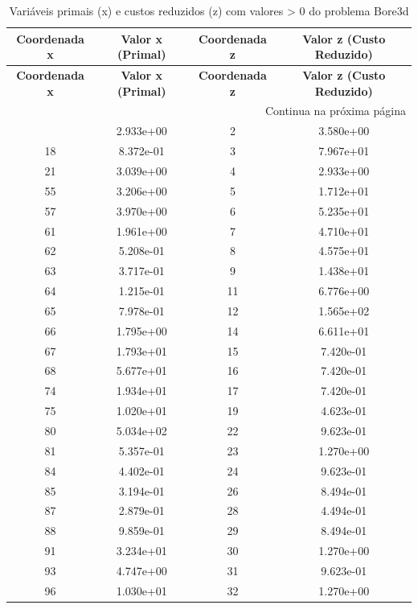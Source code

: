 \documentclass[12pt]{article}
\begin{document}
\begin{longtable}{@{}cccc@{}}
\caption{Variáveis primais (x) e custos reduzidos (z) com valores > 0 do problema Bore3d} \\
\toprule
\textbf{Coordenada x} & \textbf{Valor x (Primal)} & \textbf{Coordenada z} & \textbf{Valor z (Custo Reduzido)} \\
\midrule
\endfirsthead

\toprule
\textbf{Coordenada x} & \textbf{Valor x (Primal)} & \textbf{Coordenada z} & \textbf{Valor z (Custo Reduzido)} \\
\midrule
\endhead

\midrule \multicolumn{4}{r}{{Continua na próxima página}} \\ \midrule
\endfoot

\bottomrule
\endlastfoot
1 & 2.933e+00 & 2 & 3.580e+00 \\
18 & 8.372e-01 & 3 & 7.967e+01 \\
21 & 3.039e+00 & 4 & 2.933e+00 \\
55 & 3.206e+00 & 5 & 1.712e+01 \\
57 & 3.970e+00 & 6 & 5.235e+01 \\
61 & 1.961e+00 & 7 & 4.710e+01 \\
62 & 5.208e-01 & 8 & 4.575e+01 \\
63 & 3.717e-01 & 9 & 1.438e+01 \\
64 & 1.215e-01 & 11 & 6.776e+00 \\
65 & 7.978e-01 & 12 & 1.565e+02 \\
66 & 1.795e+00 & 14 & 6.611e+01 \\
67 & 1.793e+01 & 15 & 7.420e-01 \\
68 & 5.677e+01 & 16 & 7.420e-01 \\
74 & 1.934e+01 & 17 & 7.420e-01 \\
75 & 1.020e+01 & 19 & 4.623e-01 \\
80 & 5.034e+02 & 22 & 9.623e-01 \\
81 & 5.357e-01 & 23 & 1.270e+00 \\
84 & 4.402e-01 & 24 & 9.623e-01 \\
85 & 3.194e-01 & 26 & 8.494e-01 \\
87 & 2.879e-01 & 28 & 4.494e-01 \\
88 & 9.859e-01 & 29 & 8.494e-01 \\
91 & 3.234e+01 & 30 & 1.270e+00 \\
93 & 4.747e+00 & 31 & 9.623e-01 \\
96 & 1.030e+01 & 32 & 1.270e+00 \\

\end{longtable}
\end{document}
